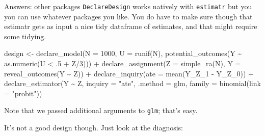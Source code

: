 \documentclass[
  11pt,
  ignorenonframetext,
]{beamer}
\newenvironment{Shaded}{\begin{snugshade}}{\end{snugshade}}
\newcommand{\AttributeTok}[1]{\textcolor[rgb]{0.40,0.45,0.13}{#1}}
\newcommand{\DecValTok}[1]{\textcolor[rgb]{0.68,0.00,0.00}{#1}}
\newcommand{\FunctionTok}[1]{\textcolor[rgb]{0.28,0.35,0.67}{#1}}
\newcommand{\NormalTok}[1]{\textcolor[rgb]{0.00,0.23,0.31}{#1}}
\newcommand{\OtherTok}[1]{\textcolor[rgb]{0.00,0.23,0.31}{#1}}
\newcommand{\SpecialCharTok}[1]{\textcolor[rgb]{0.37,0.37,0.37}{#1}}
\newcommand{\StringTok}[1]{\textcolor[rgb]{0.13,0.47,0.30}{#1}}
\begin{document}
\begin{frame}[fragile]{Answers: other packages}
\protect\hypertarget{answers-other-packages}{}
\texttt{DeclareDesign} works natively with \texttt{estimatr} but you you
can use whatever packages you like. You do have to make sure though that
estimatr gets as input a nice tidy dataframe of estimates, and that
might require some tidying.

\begin{Shaded}
\begin{Highlighting}[]
\NormalTok{design }\OtherTok{\textless{}{-}} 
  \FunctionTok{declare\_model}\NormalTok{(}\AttributeTok{N =} \DecValTok{1000}\NormalTok{, }\AttributeTok{U =} \FunctionTok{runif}\NormalTok{(N), }
                \FunctionTok{potential\_outcomes}\NormalTok{(Y }\SpecialCharTok{\textasciitilde{}} \FunctionTok{as.numeric}\NormalTok{(U }\SpecialCharTok{\textless{}}\NormalTok{ .}\DecValTok{5} \SpecialCharTok{+}\NormalTok{ Z}\SpecialCharTok{/}\DecValTok{3}\NormalTok{))) }\SpecialCharTok{+} 
  \FunctionTok{declare\_assignment}\NormalTok{(}\AttributeTok{Z =} \FunctionTok{simple\_ra}\NormalTok{(N), }\AttributeTok{Y =} \FunctionTok{reveal\_outcomes}\NormalTok{(Y }\SpecialCharTok{\textasciitilde{}}\NormalTok{ Z)) }\SpecialCharTok{+} 
  \FunctionTok{declare\_inquiry}\NormalTok{(}\AttributeTok{ate =} \FunctionTok{mean}\NormalTok{(Y\_Z\_1 }\SpecialCharTok{{-}}\NormalTok{ Y\_Z\_0)) }\SpecialCharTok{+} 
  \FunctionTok{declare\_estimator}\NormalTok{(Y }\SpecialCharTok{\textasciitilde{}}\NormalTok{ Z, }\AttributeTok{inquiry =} \StringTok{"ate"}\NormalTok{, }
                    \AttributeTok{.method =}\NormalTok{ glm, }
                    \AttributeTok{family =} \FunctionTok{binomial}\NormalTok{(}\AttributeTok{link =} \StringTok{"probit"}\NormalTok{))}
\end{Highlighting}
\end{Shaded}

Note that we passed additional arguments to \texttt{glm}; that's easy.

It's not a good design though. Just look at the diagnosis:
\end{frame}
\end{document}
